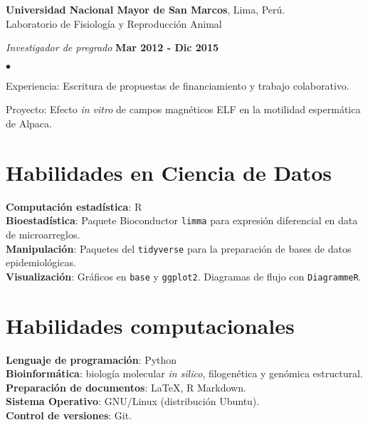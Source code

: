 \documentclass[margin,line]{res}
\newenvironment{list1}{
	\begin{list}{\ding{113}}{%
			\setlength{\itemsep}{0in}
			\setlength{\parsep}{0in} \setlength{\parskip}{0in}
			\setlength{\topsep}{0in} \setlength{\partopsep}{0in}
			\setlength{\leftmargin}{0.17in}}}{\end{list}}
\newenvironment{list2}{
	\begin{list}{$\bullet$}{%
			\setlength{\itemsep}{0in}
			\setlength{\parsep}{0in} \setlength{\parskip}{0in}
			\setlength{\topsep}{0in} \setlength{\partopsep}{0in}
			\setlength{\leftmargin}{0.2in}}}{\end{list}}
\begin{document}
\begin{resume}
		{\bf Universidad Nacional Mayor de San Marcos}, Lima, Perú.\\
		Laboratorio de Fisiología y Reproducción Animal\\
		\vspace*{-.1in}
		\begin{list1}
			\item[] {\em Investigador de pregrado} \hfill {\bf Mar 2012 - Dic 2015}\\
			\vspace*{-.1in}
			\begin{list2}
				\item Experiencia: Escritura de propuestas de financiamiento y trabajo colaborativo.
				\item Proyecto: Efecto \textit{in vitro} de campos magnéticos ELF en la motilidad espermática de Alpaca.\\
			\end{list2}
		\end{list1}
		
		\section{\sc Habilidades en Ciencia de Datos}%
		{\bf Computación estadística}: R\\
		{\bf Bioestadística}: Paquete Bioconductor \texttt{limma} para expresión diferencial en data de microarreglos.\\ 
		{\bf Manipulación}: Paquetes del \texttt{tidyverse} para la preparación de bases de datos epidemiológicas.\\
		{\bf Visualización}: Gráficos en \texttt{base} y \texttt{ggplot2}. Diagramas de flujo con \texttt{DiagrammeR}.\\ 	
		
		\section{\sc Habilidades computacionales}
		{\bf Lenguaje de programación}: Python\\%
		{\bf Bioinformática}: biología molecular \textit{in silico}, filogenética y genómica estructural.\\	%
		{\bf Preparación de documentos}: LaTeX, R Markdown.\\
		{\bf Sistema Operativo}: GNU/Linux (distribución Ubuntu).\\ %
		{\bf Control de versiones}: Git.\\ %
		

\end{resume}
\end{document}
